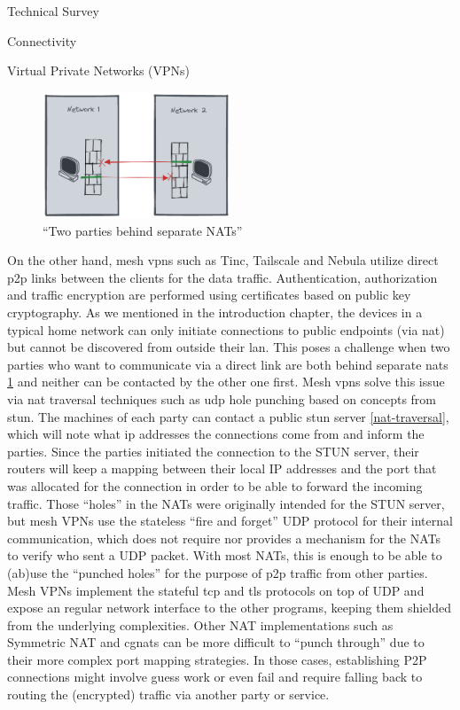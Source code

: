 \begin{frame}{Technical Survey}
\begin{block}{Connectivity}
\begin{block}{Virtual Private Networks (VPNs)}
\begin{figure}
\centering
\includegraphics[width=0.5\textwidth,height=0.25\textheight]{prep/../figures/nat-intro.png}
\caption{``Two parties behind separate NATs''\label{nat-intro}}
\end{figure}

On the other hand, mesh \glspl{vpn} such as Tinc\autocite{tincDocs},
Tailscale\autocite{tailscaleDocs} and Nebula\autocite{nebulaDocs}
utilize direct \gls{p2p} links between the clients for the data traffic.
Authentication, authorization and traffic encryption are performed using
certificates based on public key cryptography. As we mentioned in the
introduction chapter, the devices in a typical home network can only
initiate connections to public endpoints (via \gls{nat}) but cannot be
discovered from outside their \gls{lan}. This poses a challenge when two
parties who want to communicate via a direct link are both behind
separate \glspl{nat} \ref{nat-intro} and neither can be contacted by the
other one first. Mesh \glspl{vpn} solve this issue via \gls{nat}
traversal techniques such as \gls{udp} hole punching based on concepts
from \gls{stun}. The machines of each party can contact a public
\gls{stun} server \ref{nat-traversal}, which will note what \gls{ip}
addresses the connections come from and inform the parties. Since the
parties initiated the connection to the STUN server, their routers will
keep a mapping between their local IP addresses and the port that was
allocated for the connection in order to be able to forward the incoming
traffic. Those ``holes'' in the NATs were originally intended for the
STUN server, but mesh VPNs use the stateless ``fire and forget'' UDP
protocol for their internal communication, which does not require nor
provides a mechanism for the NATs to verify who sent a UDP packet. With
most NATs, this is enough to be able to (ab)use the ``punched holes''
for the purpose of \gls{p2p} traffic from other parties. Mesh VPNs
implement the stateful \gls{tcp} and \gls{tls} protocols on top of UDP
and expose an regular network interface to the other programs, keeping
them shielded from the underlying complexities. Other NAT
implementations such as Symmetric NAT and \glspl{cgnat} can be more
difficult to ``punch through'' due to their more complex port mapping
strategies. In those cases, establishing P2P connections might involve
guess work or even fail and require falling back to routing the
(encrypted) traffic via another party or service.


\end{block}
\end{block}
\end{frame}
